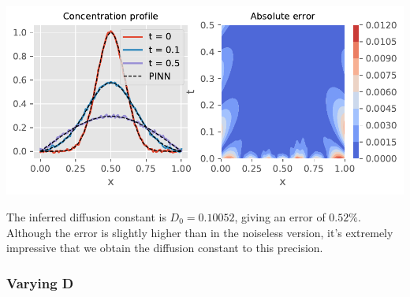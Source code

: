 \documentclass[12pt,a4paper,]{Dissertate}
\let\origfigure\figure
\let\endorigfigure\endfigure
\renewenvironment{figure}[1][2] {
    \expandafter\origfigure\expandafter[H]
} {
    \endorigfigure
}
\begin{document}
\begin{figure}
\hypertarget{fig:error_constantD_noisy}{%
\centering
\includegraphics{source/figures/pdf/error_constantD_noisy.pdf}
\caption{\textbf{Left panel}: The original noisy concentration profile
with the neural network inferred denoised version super imposed.
\textbf{Right panel}: The absolute error of neural network with respect
to the ground truth. Note that most of the error is located at areas
with low concentration.}\label{fig:error_constantD_noisy}
}
\end{figure}

The inferred diffusion constant is \(D_0 = 0.10052\), giving an error of
\(0.52\%\). Although the error is slightly higher than in the noiseless
version, it's extremely impressive that we obtain the diffusion constant
to this precision.

\hypertarget{varying-d}{%
\subsubsection{Varying D}\label{varying-d}}
\end{document}
